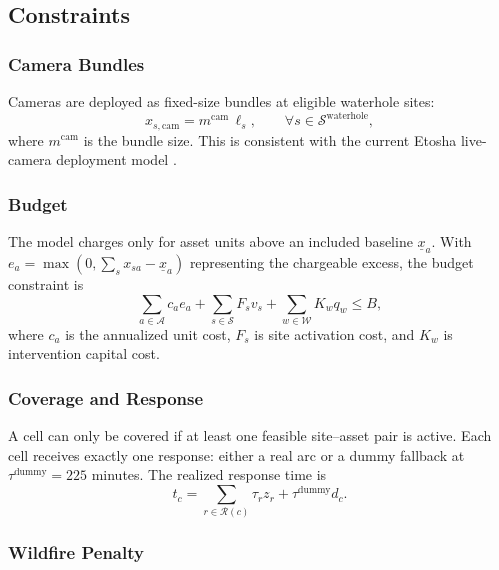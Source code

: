 \subsection{Constraints}

\subsubsection{Camera Bundles}

Cameras are deployed as fixed-size bundles at eligible waterhole sites:
\[
x_{s,\mathrm{cam}} = m^{\mathrm{cam}} \,\ell_s,
\qquad
\forall s \in \mathcal{S}^{\mathrm{waterhole}},
\]
where $m^{\mathrm{cam}}$ is the bundle size. This is consistent with the current Etosha live-camera deployment model \cite{nwr_live_camera,reconyx_hyperfire4k}.

\subsubsection{Budget}

The model charges only for asset units above an included baseline $\underline{x}_a$. With $e_a = \max(0, \sum_s x_{sa} - \underline{x}_a)$ representing the chargeable excess, the budget constraint is
\[
\sum_{a \in \mathcal{A}} c_a e_a
+ \sum_{s \in \mathcal{S}} F_s v_s
+ \sum_{w \in \mathcal{W}} K_w q_w
\le B,
\]
where $c_a$ is the annualized unit cost, $F_s$ is site activation cost, and $K_w$ is intervention capital cost.

\subsubsection{Coverage and Response}

A cell can only be covered if at least one feasible site--asset pair is active. Each cell receives exactly one response: either a real arc or a dummy fallback at $\tau^{\mathrm{dummy}} = 225$ minutes. The realized response time is
\[
t_c = \sum_{r \in \mathcal{R}(c)} \tau_r z_r + \tau^{\mathrm{dummy}} d_c.
\]

\subsubsection{Wildfire Penalty}

